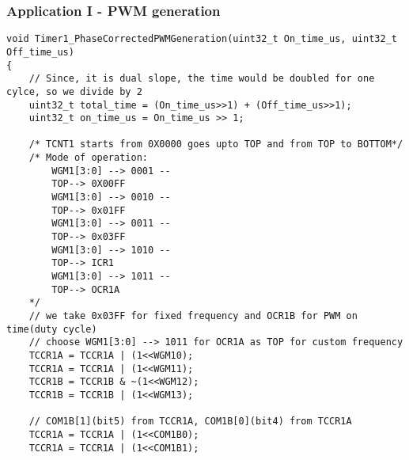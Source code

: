 \documentclass{article}
\begin{document}
\subsubsection{Application I - PWM generation}
\begin{verbatim}
void Timer1_PhaseCorrectedPWMGeneration(uint32_t On_time_us, uint32_t Off_time_us)
{
    // Since, it is dual slope, the time would be doubled for one cylce, so we divide by 2
    uint32_t total_time = (On_time_us>>1) + (Off_time_us>>1);
    uint32_t on_time_us = On_time_us >> 1;
        
    /* TCNT1 starts from 0X0000 goes upto TOP and from TOP to BOTTOM*/
    /* Mode of operation:
        WGM1[3:0] --> 0001 --
        TOP--> 0X00FF
        WGM1[3:0] --> 0010 --
        TOP--> 0x01FF
        WGM1[3:0] --> 0011 --
        TOP--> 0x03FF
        WGM1[3:0] --> 1010 --
        TOP--> ICR1
        WGM1[3:0] --> 1011 --
        TOP--> OCR1A
    */
    // we take 0x03FF for fixed frequency and OCR1B for PWM on time(duty cycle)
    // choose WGM1[3:0] --> 1011 for OCR1A as TOP for custom frequency
    TCCR1A = TCCR1A | (1<<WGM10);
    TCCR1A = TCCR1A | (1<<WGM11);
    TCCR1B = TCCR1B & ~(1<<WGM12);
    TCCR1B = TCCR1B | (1<<WGM13);

    // COM1B[1](bit5) from TCCR1A, COM1B[0](bit4) from TCCR1A
    TCCR1A = TCCR1A | (1<<COM1B0);
    TCCR1A = TCCR1A | (1<<COM1B1);
    

\end{verbatim}
\end{document}
